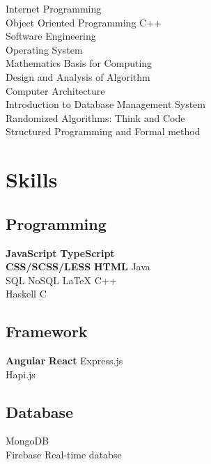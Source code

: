 \documentclass[letterpaper]{deedy-resume} %
\begin{document}
\begin{minipage}[t]{0.33\textwidth}
Internet Programming\\
Object Oriented Programming C++\\
Software Engineering\\
Operating System\\
Mathematics Basis for Computing\\
Design and Analysis of Algorithm\\
Computer Architecture\\
Introduction to Database Management System\\
Randomized Algorithms: Think and Code\\
Structured Programming and Formal method\\




\sectionspace %


\section{Skills}

\subsection{Programming}

\textbf{JavaScript} \textbullet{} \textbf{TypeScript}\textbullet{} \\
\textbf{CSS/SCSS/LESS} \textbullet{} \textbf{HTML} \textbullet{} Java \\
SQL \textbullet{} NoSQL \textbullet{} \LaTeX \textbullet{} C++\\
Haskell \textbullet{} C \\
\subsection{Framework}
\textbf{Angular} \textbullet{} \textbf{React} \textbullet{} Express.js \\ Hapi.js
\subsection{Database}
MongoDB \\ Firebase Real-time databse

\end{minipage}
\end{document}
